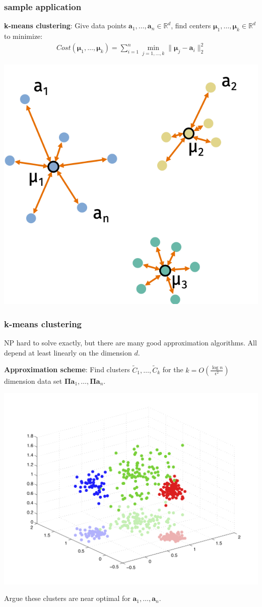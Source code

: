 \documentclass[compress]{beamer}
\newcommand{\bs}[1]{\boldsymbol{#1}}
\newcommand{\bv}[1]{\mathbf{#1}}
\newcommand{\R}{\mathbb{R}}
\begin{document}
\begin{frame}[t]
	\frametitle{sample application}
	\textbf{k-means clustering}: Give data points $\bv{a}_1,\ldots, \bv{a}_n \in \R^d$, find centers $\bs{\mu}_1, \ldots, \bs{\mu}_k\in \R^d$ to minimize:
	\begin{align*}
		Cost(\bs{\mu}_1,\ldots, \bs{\mu}_k) = \sum_{i=1}^n \min_{j = 1,\ldots,k} \|\bs{\mu}_j - \bv{a}_i\|_2^2
	\end{align*}
	\begin{center}
		\includegraphics[width=.5\textwidth]{kmeans3.png}
	\end{center}
\end{frame}

\begin{frame}[t]
	\frametitle{k-means clustering}
	NP hard to solve exactly, but there are many good approximation algorithms. All depend at least linearly on the dimension $d$. 
	
	\textbf{Approximation scheme}: Find clusters $\tilde{C}_1, \ldots, \tilde{C}_k$ for the $k = O\left(\frac{\log n}{\epsilon^2}\right)$ dimension data set $\bs{\Pi}\bv{a}_1, \ldots, \bs{\Pi}\bv{a}_n.$
	
	\vspace{-3em}
	\begin{center}
		\includegraphics[width=.6\textwidth]{clustering_projected.png}
	\end{center}
	\vspace{-2em}
	Argue these clusters are near optimal for $\bv{a}_1, \ldots, \bv{a}_n$.
\end{frame}
\end{document}
